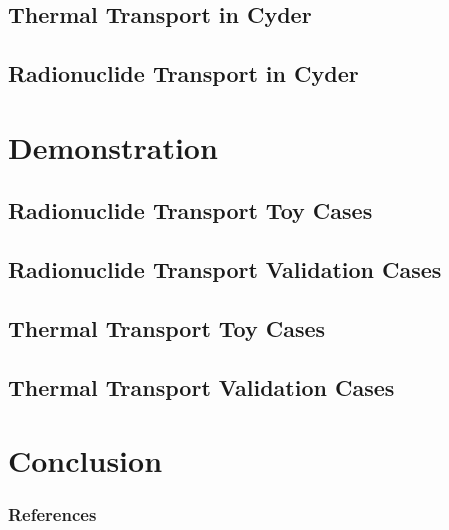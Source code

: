 \documentclass[9pt]{beamer}
\begin{document}
%
\subsection{Thermal Transport in Cyder}

\subsection{Radionuclide Transport in Cyder}


\section{Demonstration}

\subsection{Radionuclide Transport Toy Cases}

\subsection{Radionuclide Transport Validation Cases}

\subsection{Thermal Transport Toy Cases}

\subsection{Thermal Transport Validation Cases}


\section{Conclusion}


\begin{frame}[allowframebreaks]
  \frametitle{References}
  
  {\footnotesize  }

\end{frame}




\end{document}
